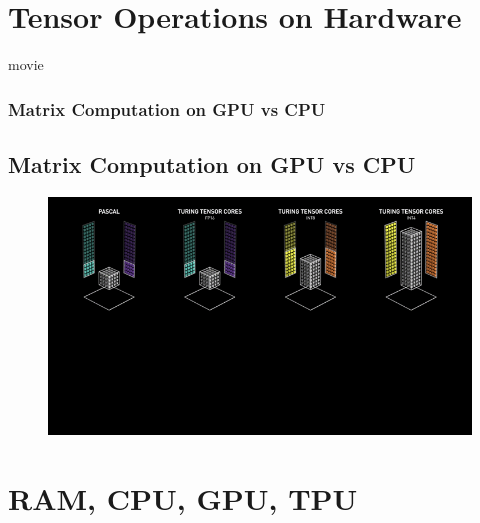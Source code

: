 \documentclass[11pt]{beamer}
\begin{document}
\section{Tensor Operations on Hardware}
\begin{frame}{movie}
	\frametitle{Matrix Computation on GPU vs CPU}
	\subsection{Matrix Computation on GPU vs CPU}
	\begin{figure}[h!]
	\centering
	{\includegraphics[width=1.0\textwidth]{gpugif.png}}
	\end{figure}
\end{frame}

\section{RAM, CPU, GPU, TPU}
\end{document}
